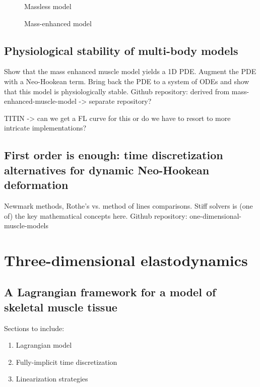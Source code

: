 \documentclass{sfuthesis}
\numberwithin{equation}{chapter}
\numberwithin{figure}{chapter}
\numberwithin{table}{chapter}
\theoremstyle{definition}
\begin{document}
\begin{figure}
    \caption{Massless model}
    \label{fig:massless_model}
\end{figure}

\begin{figure}
    \caption{Mass-enhanced model}
    \label{fig:massenhanced_model}
\end{figure}












\chapter{Physiological stability of multi-body models}

Show that the mass enhanced muscle model yields a 1D PDE. Augment the PDE with a Neo-Hookean term. Bring back the PDE to a system of ODEs and show that this model is physiologically stable.
Github repository: derived from mass-enhanced-muscle-model -> separate repository?

\medskip

TITIN -> can we get a FL curve for this or do we have to resort to more intricate implementations?


\chapter{First order is enough: time discretization alternatives for dynamic Neo-Hookean deformation}

Newmark methods, Rothe's vs. method of lines comparisons. Stiff solvers is (one of) the key mathematical concepts here.
Github repository: one-dimensional-muscle-models

\part{Three-dimensional elastodynamics}

\chapter{A Lagrangian framework for a model of skeletal muscle tissue}

Sections to include:
\begin{enumerate}
    \item Lagrangian model
    \item Fully-implicit time discretization
    \item Linearization strategies
\end{enumerate}
\end{document}
